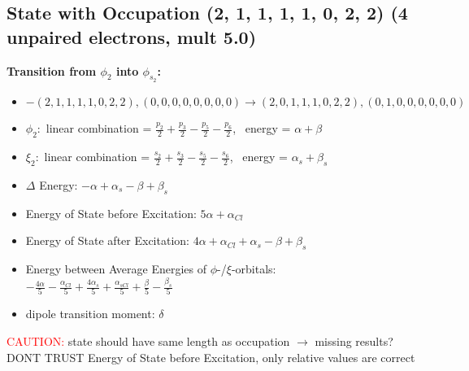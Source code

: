 \documentclass[12pt,a4paper]{article}
\begin{document}
\subsection*{State with Occupation (2, 1, 1, 1, 1, 0, 2, 2) (4 unpaired electrons, mult 5.0)}
        \noindent\textbf{Transition from $\phi_{2}$ into $\phi_{s_{2}}$:}
        \begin{itemize}
            \item $- (2, 1, 1, 1, 1, 0, 2, 2), (0, 0, 0, 0, 0, 0, 0, 0) \rightarrow (2, 0, 1, 1, 1, 0, 2, 2), (0, 1, 0, 0, 0, 0, 0, 0)$
        
            \item $\phi_{2}:$ linear combination = $\frac{p_{2}}{2} + \frac{p_{3}}{2} - \frac{p_{5}}{2} - \frac{p_{6}}{2}$, \
            energy = $\alpha + \beta$
            
            \item $\xi_{2}:$ linear combination = $\frac{s_{2}}{2} + \frac{s_{3}}{2} - \frac{s_{5}}{2} - \frac{s_{6}}{2}$, \
            energy = $\alpha_{s} + \beta_{s}$
            
            \item $\Delta$ Energy: $- \alpha + \alpha_{s} - \beta + \beta_{s}$
            \item Energy of State before Excitation: $5 \alpha + \alpha_{Cl}$
            \item Energy of State after Excitation: $4 \alpha + \alpha_{Cl} + \alpha_{s} - \beta + \beta_{s}$
            \item Energy between Average Energies of $\phi$-/$\xi$-orbitals: \
            $- \frac{4 \alpha}{5} - \frac{\alpha_{Cl}}{5} + \frac{4 \alpha_{s}}{5} + \frac{\alpha_{s Cl}}{5} + \frac{\beta}{5} - \frac{\beta_{s}}{5}$
        
            \item dipole transition moment: $\delta$
        
        \end{itemize}
        
	\textcolor{red}{CAUTION:} state should have same length as occupation $\rightarrow$ missing results?
	DONT TRUST \glqq{}Energy of State before Excitation\grqq{}, only relative values are correct
\end{document}
